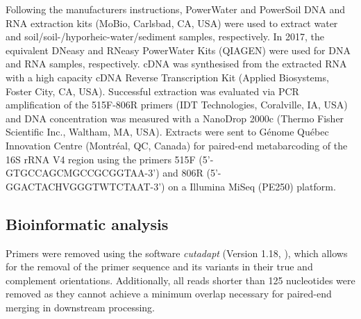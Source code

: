 \documentclass[12pt,a4paper]{article} %
\begin{document}
Following the manufacturers instructions, PowerWater\textsuperscript{\textregistered} and PowerSoil\textsuperscript{\textregistered} DNA and RNA extraction kits (MoBio, Carlsbad, CA, USA) were used to extract water and soil/soil-/hyporheic-water/sediment samples, respectively. In 2017, the equivalent DNeasy\textsuperscript{\textregistered} and RNeasy\textsuperscript{\textregistered} PowerWater\textsuperscript{\textregistered} Kits (QIAGEN\textsuperscript{\textregistered}) were used for DNA and RNA samples, respectively. cDNA was synthesised from the extracted RNA with a high capacity cDNA Reverse Transcription Kit (Applied Biosystems\textsuperscript{\texttrademark}, Foster City, CA, USA). Successful extraction was evaluated via PCR amplification of the 515F-806R primers (IDT Technologies, Coralville, IA, USA) and DNA concentration was measured with a NanoDrop 2000c (Thermo Fisher Scientific Inc., Waltham, MA, USA). Extracts were sent to G\'{e}nome Qu\'{e}bec Innovation Centre (Montr\'{e}al, QC, Canada) for paired-end metabarcoding of the 16S rRNA V4 region using the primers 515F (5'-GTGCCAGCMGCCGCGGTAA-3') and 806R (5'-GGACTACHVGGGTWTCTAAT-3') on a Illumina MiSeq (PE250) platform.

\subsection*{Bioinformatic analysis}
Primers were removed using the software \textit{cutadapt} (Version 1.18, \citet{Martin2013}), which allows for the removal of the primer sequence and its variants in their true and complement orientations. Additionally, all reads shorter than 125 nucleotides were removed as they cannot achieve a minimum overlap necessary for paired-end merging in downstream processing.
\end{document}
